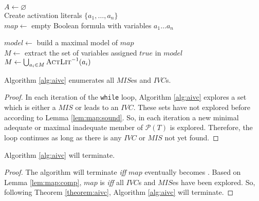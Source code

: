 \begin{algorithm}[t]
  $A \leftarrow \varnothing$\\
  Create activation literals $\{a_1, \ldots, a_n\}$ \\
  $map \leftarrow$ empty Boolean formula with variables $a_1 \ldots a_n$ \\
  \BlankLine

   {
    $model \leftarrow $ build a maximal model of $map$ \\
    $M \leftarrow$ extract the set of variables assigned $true$ in $model$ \\
    $M \leftarrow \bigcup_{a_i \in M} \textsc{ActLit} ^{-1}(a_i)$ \\
\BlankLine
  }
\caption{$\aivcalg (T, P)$}
\label{alg:aivc}
\end{algorithm}

\begin{theorem}
\label{theorem:aivc}
  Algorithm \ref{alg:aivc} enumerates all $MIS$es and $IVC$s.
\end{theorem}
\begin{proof}
In each iteration of the \texttt{while} loop, Algorithm \ref{alg:aivc} explores a set which is either a $MIS$ or leads to an $IVC$. These sets have not explored before according to Lemma \ref{lem:map:sound}. So, in each iteration a new minimal adequate or maximal inadequate member of $\mathcal {P}(T)$ is explored. Therefore, the loop continues as long as there is any $IVC$ or
$MIS$ not yet found.
\end{proof}


\begin{theorem}
  Algorithm \ref{alg:aivc} will terminate.
\end{theorem}
\begin{proof}
The algorithm will terminate \emph{iff} $map$ eventually becomes  \unsat.
Based on Lemma \ref{lem:map:comp}, $map$ is \unsat \emph{iff} all
$IVC$s and $MIS$es have been explored.
So, following Theorem \ref{theorem:aivc},  Algorithm \ref{alg:aivc} will terminate.
\end{proof}



